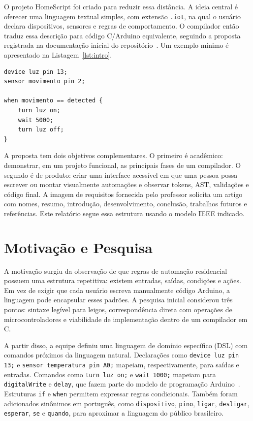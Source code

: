 \documentclass[conference]{IEEEtran}
\begin{document}
O projeto HomeScript foi criado para reduzir essa distância. A ideia central é oferecer uma linguagem textual simples, com extensão \texttt{.iot}, na qual o usuário declara dispositivos, sensores e regras de comportamento. O compilador então traduz essa descrição para código C/Arduino equivalente, seguindo a proposta registrada na documentação inicial do repositório~\cite{repo-readme,docs-def}. Um exemplo mínimo é apresentado na Listagem~\ref{lst:intro}.

\begin{lstlisting}[style=homescript,caption={Exemplo simples em HomeScript.},label={lst:intro}]
device luz pin 13;
sensor movimento pin 2;

when movimento == detected {
    turn luz on;
    wait 5000;
    turn luz off;
}
\end{lstlisting}

A proposta tem dois objetivos complementares. O primeiro é acadêmico: demonstrar, em um projeto funcional, as principais fases de um compilador. O segundo é de produto: criar uma interface acessível em que uma pessoa possa escrever ou montar visualmente automações e observar tokens, AST, validações e código final. A imagem de requisitos fornecida pelo professor solicita um artigo com nomes, resumo, introdução, desenvolvimento, conclusão, trabalhos futuros e referências. Este relatório segue essa estrutura usando o modelo IEEE indicado.

\section{Motivação e Pesquisa}
A motivação surgiu da observação de que regras de automação residencial possuem uma estrutura repetitiva: existem entradas, saídas, condições e ações. Em vez de exigir que cada usuário escreva manualmente código Arduino, a linguagem pode encapsular esses padrões. A pesquisa inicial considerou três pontos: sintaxe legível para leigos, correspondência direta com operações de microcontroladores e viabilidade de implementação dentro de um compilador em C.

A partir disso, a equipe definiu uma linguagem de domínio específico (DSL) com comandos próximos da linguagem natural. Declarações como \texttt{device luz pin 13;} e \texttt{sensor temperatura pin A0;} mapeiam, respectivamente, para saídas e entradas. Comandos como \texttt{turn luz on;} e \texttt{wait 1000;} mapeiam para \texttt{digitalWrite} e \texttt{delay}, que fazem parte do modelo de programação Arduino~\cite{arduino}. Estruturas \texttt{if} e \texttt{when} permitem expressar regras condicionais. Também foram adicionados sinônimos em português, como \texttt{dispositivo}, \texttt{pino}, \texttt{ligar}, \texttt{desligar}, \texttt{esperar}, \texttt{se} e \texttt{quando}, para aproximar a linguagem do público brasileiro.
\end{document}

